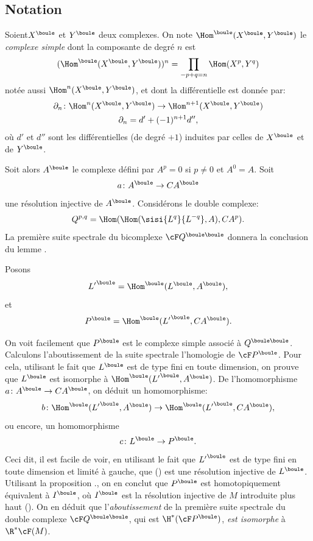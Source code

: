 \subsection*{Notation}
Soient\pageoriginale $X^\boule$ et $Y^\boule$ deux complexes. On note $\Hom^\boule(X^\boule, Y^\boule)$ le \emph{complexe simple} dont la composante de degr\'e $n$ est
\[(\Hom^\boule(X^\boule, Y^\boule))^n=\prod_{-p+q=n}\Hom(X^p, Y^q)\]
not\'ee aussi $\Hom^n(X^\boule, Y^\boule)$, et dont la diff\'erentielle est donn\'ee par:
\begin{gather*}
\partial_n\colon \Hom^n(X^\boule, Y^\boule)\to \Hom^{n+1}(X^\boule, Y^\boule)\\
\partial_n=d'+(-1)^{n+1}d'',
\end{gather*}
o\`u $d'$ et $d''$ sont les diff\'erentielles (de degr\'e $+1$) induites par celles de $X^\boule$ et de $Y^\boule$.

\setcounter{equation}{1} Soit alors $A^\boule$ le complexe d\'efini par $A^p=0$ si $p\neq 0$ et $A^0=A$. Soit
\[a\colon A^\boule \to CA^\boule\]
une r\'esolution injective de $A^\boule$. Consid\'erons le double complexe:
\begin{equation} \label{eq:VIII.1.2} Q^{p, q}=\Hom(\Hom(\sisi{L^q}{L^{-q}}, A), CA^p).
\end{equation}
La premi\`ere suite spectrale du bicomplexe ${\cF}Q^{\boule\boule}$ donnera la conclusion du lemme .

Posons
\begin{equation} \label{eq:VIII.1.3} {L'}^\boule=\Hom^\boule(L^\boule, A^\boule),
\end{equation}
et
\begin{equation} \label{eq:VIII.1.4} P^\boule=\Hom^\boule({L'}^\boule, CA^\boule).
\end{equation}

On voit facilement que $P^\boule$ est le complexe simple associ\'e \`a $Q^{\boule\boule}$. Calculons l'aboutissement de la suite spectrale \ie l'homologie de ${\cF}P^\boule$. Pour cela, utilisant le fait que $L^\boule$ est  de type fini en toute dimension, on prouve que $L^\boule$ est isomorphe \`a $\Hom^\boule({L'}^\boule, A^\boule)$. De l'homomorphisme $a\colon A^\boule\to CA^\boule$\pageoriginale, on d\'eduit un homomorphisme:
\[b\colon \Hom^\boule({L'}^\boule, A^\boule)\to \Hom^\boule({L'}^\boule, CA^\boule), \]
ou encore, un homomorphisme
\begin{equation} \label{eq:VIII.1.5} c\colon L^\boule\to P^\boule.
\end{equation}
Ceci dit, il est facile de voir, en utilisant le fait que ${L'}^\boule$ est  de type fini en toute dimension et limit\'e \`a gauche, que () est une r\'esolution injective de $L^\boule$. Utilisant la proposition ., on en conclut que $P^\boule$ est homotopiquement \'equivalent \`a $I^\boule$, o\`u $I^\boule$ est la r\'esolution injective de $M$ introduite plus haut (). On en d\'eduit que l'\emph{aboutissement} de la premi\`ere suite spectrale du double complexe ${\cF}Q^{\boule\boule}$, qui est $\H^\ast({\cF}P^\boule)$, \emph{est isomorphe} \`a $\R^\ast {\cF}(M)$.

